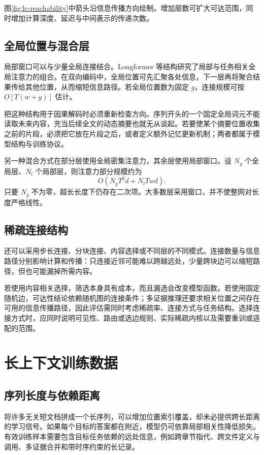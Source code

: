 \documentclass[../textbook.tex]{subfiles}
\begin{document}
图\ref{fig:lc-reachability}中箭头沿信息传播方向绘制。增加层数可扩大可达范围，同时增加计算深度、延迟与中间表示的传递次数。

\subsection{全局位置与混合层}
局部窗口可以与少量全局连接结合。Longformer 等结构研究了局部与任务相关全局注意力的组合\cite{beltagy2020longformer}。在双向编码中，全局位置可先汇聚各处信息，下一层再将聚合结果传给其他位置，从而缩短信息路径。若全局位置数为固定 $g$，连接规模可按 $O[T(w+g)]$ 估计。

把这种结构用于因果解码时必须重新检查方向。序列开头的一个固定全局词元不能读取未来内容，充当后续全文的动态摘要也就无从谈起。若要使某个摘要位置收集之前的片段，必须把它放在片段之后，或者定义额外记忆更新机制；两者都属于模型结构与训练协议。

另一种混合方式在部分层使用全局密集注意力，其余层使用局部窗口。设 $N_g$ 个全局层、$N_l$ 个局部层，则注意力部分规模约为
\begin{equation}
 O(N_gT^2d+N_lTwd).
\end{equation}
只要 $N_g$ 不为零，超长长度下仍存在二次项。大多数层采用窗口，并不使整网对长度严格线性。

\subsection{稀疏连接结构}
还可以采用步长连接、分块连接、内容选择或不同层的不同模式。连接数量与信息路径分别影响计算和传播：只连接近邻可能难以跨越远处，少量跨块边可以缩短路径，但也可能漏掉所需内容。

若使用内容相关选择，筛选本身具有成本，而且漏选会改变模型函数。若使用固定随机边，可达性结论依赖随机图的连接条件；多证据推理还要求相关位置之间存在可用的信息传播路径，因此评估需同时考虑稀疏率、连接方式与任务结构。选择连接方式时，应同时说明可见性、路由或选边规则、实际稀疏内核以及需要重训或适配的范围。

\section{长上下文训练数据}

\subsection{序列长度与依赖距离}
将许多无关短文档拼成一个长序列，可以增加位置索引覆盖，却未必提供跨长距离的学习信号。如果每个目标的答案都在附近，模型仍可依靠局部相关性降低损失。有效训练样本需要包含目标任务依赖的远处信息，例如跨章节指代、跨文件定义与调用、多证据合并和带时序约束的长记录。
\end{document}

